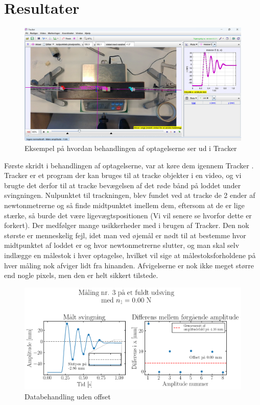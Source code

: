 \chapter{Resultater}
\begin{figure}[htbp]
    \centering
    \includegraphics[width=0.8\linewidth,origin=c]{figures/data_eksempel.png}
    \caption{Eksempel på hvordan behandlingen af optagelserne ser ud i Tracker}
    \label{fig:tracker}
\end{figure}
Første skridt i behandlingen af optagelserne, var at køre dem igennem Tracker \cite{Tracker}. 
Tracker er et program der kan bruges til at tracke objekter i en video, 
og vi brugte det derfor til at tracke bevægelsen af det røde bånd på loddet under svingningen.
Nulpunktet til trackningen, blev fundet ved at tracke de 2 ender af newtonmetrerne og så finde midtpunktet imellem dem, 
eftersom at de er lige stærke, så burde det være ligevægtspositionen (Vi vil senere se hvorfor dette er forkert).
Der medfølger mange usikkerheder med i brugen af Tracker. Den nok største er menneskelig fejl, 
idet man ved øjemål er nødt til at bestemme hvor midtpunktet af loddet er og hvor newtonmetrerne slutter,
og man skal selv indlægge en målestok i hver optagelse, hvilket vil sige at målestoksforholdene på hver måling nok afviger lidt fra hinanden. 
Afvigelserne er nok ikke meget større end nogle pixels, men den er helt sikkert tilstede.
\begin{figure}[htbp]
    \centering
    \includegraphics[width=0.8\linewidth,origin=c]{figures/non0.00-maks3.png}
    \caption{Databehandling uden offset}
    \label{fig:dårlig_graf}
\end{figure}
